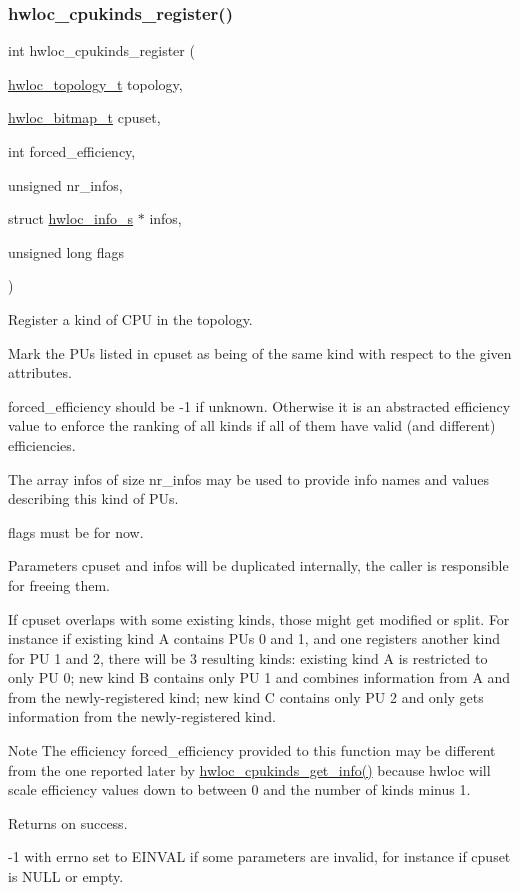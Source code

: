 \subsubsection{\texorpdfstring{hwloc\+\_\+cpukinds\+\_\+register()}{hwloc\_cpukinds\_register()}}
{\footnotesize\ttfamily int hwloc\+\_\+cpukinds\+\_\+register (\begin{DoxyParamCaption}\item[{\hyperlink{a00186_ga9d1e76ee15a7dee158b786c30b6a6e38}{hwloc\+\_\+topology\+\_\+t}}]{topology,  }\item[{\hyperlink{a00205_gaa3c2bf4c776d603dcebbb61b0c923d84}{hwloc\+\_\+bitmap\+\_\+t}}]{cpuset,  }\item[{int}]{forced\+\_\+efficiency,  }\item[{unsigned}]{nr\+\_\+infos,  }\item[{struct \hyperlink{a00286}{hwloc\+\_\+info\+\_\+s} $\ast$}]{infos,  }\item[{unsigned long}]{flags }\end{DoxyParamCaption})}



Register a kind of C\+PU in the topology. 

Mark the P\+Us listed in {\ttfamily cpuset} as being of the same kind with respect to the given attributes.

{\ttfamily forced\+\_\+efficiency} should be {\ttfamily -\/1} if unknown. Otherwise it is an abstracted efficiency value to enforce the ranking of all kinds if all of them have valid (and different) efficiencies.

The array {\ttfamily infos} of size {\ttfamily nr\+\_\+infos} may be used to provide info names and values describing this kind of P\+Us.

{\ttfamily flags} must be {} for now.

Parameters {\ttfamily cpuset} and {\ttfamily infos} will be duplicated internally, the caller is responsible for freeing them.

If {\ttfamily cpuset} overlaps with some existing kinds, those might get modified or split. For instance if existing kind A contains P\+Us 0 and 1, and one registers another kind for PU 1 and 2, there will be 3 resulting kinds\+: existing kind A is restricted to only PU 0; new kind B contains only PU 1 and combines information from A and from the newly-\/registered kind; new kind C contains only PU 2 and only gets information from the newly-\/registered kind.

\begin{DoxyNote}{Note}
The efficiency {\ttfamily forced\+\_\+efficiency} provided to this function may be different from the one reported later by \hyperlink{a00213_gae1b38fbe9c645583fc16052ce6fbb275}{hwloc\+\_\+cpukinds\+\_\+get\+\_\+info()} because hwloc will scale efficiency values down to between 0 and the number of kinds minus 1.
\end{DoxyNote}
\begin{DoxyReturn}{Returns}
{} on success. 

{\ttfamily -\/1} with {\ttfamily errno} set to {\ttfamily E\+I\+N\+V\+AL} if some parameters are invalid, for instance if {\ttfamily cpuset} is {\ttfamily N\+U\+LL} or empty. 
\end{DoxyReturn}
